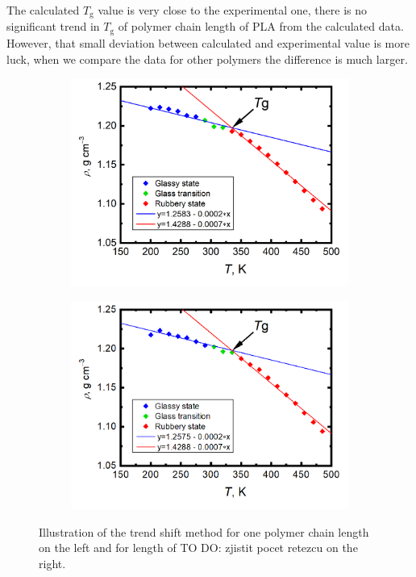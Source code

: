 The calculated $T_\mathrm{g}$ value is very close to the experimental one, there is no significant trend in $T_\mathrm{g}$ of polymer chain length of PLA from the calculated data. However, that small deviation between calculated and experimental value is more luck, when we compare the data for other polymers the difference is much larger.


\begin{figure}[H]
	\begin{subfigure}{0.5\textwidth}
		\includegraphics[width=1.0\linewidth]{img/vypocet_tg.png} 
	\end{subfigure}
	\begin{subfigure}{0.5\textwidth}
		\includegraphics[width=1.0\linewidth]{img/tg_ukazka_30.png} 
	\end{subfigure}   	
	\vspace{-1cm}
	\caption{Illustration of the trend shift method for one polymer chain length on the left and for length of TO DO: zjistit pocet retezcu on the right.}
	\label{fig:illust}
\end{figure}


